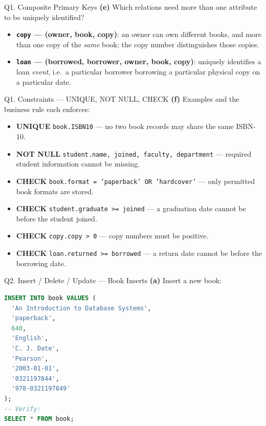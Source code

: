 \documentclass{beamer}
\begin{document}
\begin{frame}{Q1. Composite Primary Keys}
\textbf{(e)} Which relations need more than one attribute to be uniquely identified?
\begin{itemize}
  \item \textbf{\texttt{copy} — (owner, book, copy)}: an owner can own different books, and more than one copy of the \emph{same} book; the copy number distinguishes those copies.
  \item \textbf{\texttt{loan} — (borrowed, borrower, owner, book, copy)}: uniquely identifies a loan \emph{event}, i.e.\ a particular borrower borrowing a particular physical copy on a particular date.
\end{itemize}
\end{frame}

\begin{frame}[fragile]{Q1. Constraints — UNIQUE, NOT NULL, CHECK}
\textbf{(f)} Examples and the business rule each enforces:
\begin{itemize}
  \item \textbf{UNIQUE} \texttt{book.ISBN10} — no two book records may share the same ISBN-10.
  \item \textbf{NOT NULL} \texttt{student.name, joined, faculty, department} — required student information cannot be missing.
  \item \textbf{CHECK} \texttt{book.format = 'paperback' OR 'hardcover'} — only permitted book formats are stored.
  \item \textbf{CHECK} \texttt{student.graduate >= joined} — a graduation date cannot be before the student joined.
  \item \textbf{CHECK} \texttt{copy.copy > 0} — copy numbers must be positive.
  \item \textbf{CHECK} \texttt{loan.returned >= borrowed} — a return date cannot be before the borrowing date.
\end{itemize}
\end{frame}

\begin{frame}[fragile]{Q2. Insert / Delete / Update — Book Inserts}
\textbf{(a)} Insert a new book:
\begin{lstlisting}[language=SQL]
INSERT INTO book VALUES (
  'An Introduction to Database Systems',
  'paperback',
  640,
  'English',
  'C. J. Date',
  'Pearson',
  '2003-01-01',
  '0321197844',
  '978-0321197849'
);
-- Verify:
SELECT * FROM book;
\end{lstlisting}
\end{frame}
\end{document}
